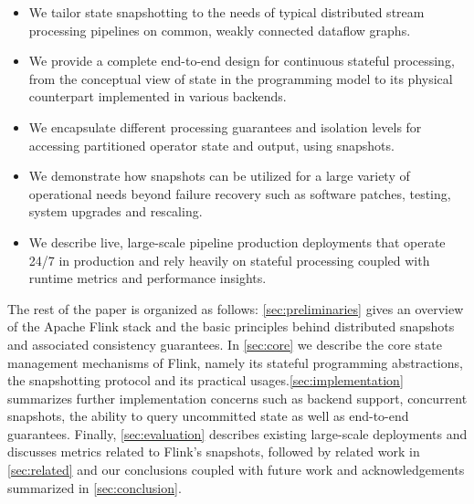 \begin{itemize}
	\item We tailor state snapshotting to the needs of typical distributed stream processing pipelines on common, weakly connected dataflow graphs.
	\item We provide a complete end-to-end design for continuous stateful processing, from the conceptual view of state in the programming model to its physical counterpart implemented in various backends.
	\item We encapsulate different processing guarantees and isolation levels for accessing partitioned operator state and output, using snapshots.
	\item We demonstrate how snapshots can be utilized for a large variety of operational needs beyond failure recovery such as software patches, testing, system upgrades and rescaling.
	\item We describe live, large-scale pipeline production deployments that operate 24/7 in production and rely heavily on stateful processing coupled with runtime metrics and performance insights.
\end{itemize}

The rest of the paper is organized as follows: \autoref{sec:preliminaries} gives an overview of the Apache Flink stack and the basic principles behind distributed snapshots and associated consistency guarantees. In \autoref{sec:core} we describe the core state management mechanisms of Flink, namely its stateful programming abstractions, the snapshotting protocol and its practical usages.\autoref{sec:implementation} summarizes further implementation concerns such as backend support, concurrent snapshots, the ability to query uncommitted state as well as end-to-end guarantees. Finally, \autoref{sec:evaluation} describes existing large-scale deployments and discusses metrics related to Flink's snapshots, followed by related work in \autoref{sec:related} and our conclusions coupled with future work and acknowledgements summarized in \autoref{sec:conclusion}. 
